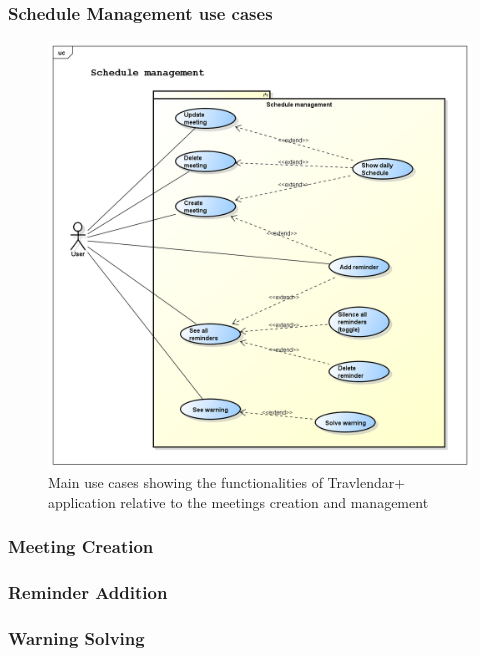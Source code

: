 \newpage
\subsubsection{Schedule Management use cases}
\begin{figure}[htp] 
\includegraphics[width=\textwidth]{usecases/png/schedulemanagement} 
\caption{Main use cases showing the functionalities of Travlendar+ application relative to the meetings creation and management} 
\label{fig:schedulemanagement} 
\end{figure}

\newpage
\subsubsection{Meeting Creation}

\newpage
\subsubsection{Reminder Addition}

\newpage
\subsubsection{Warning Solving}



\newpage
